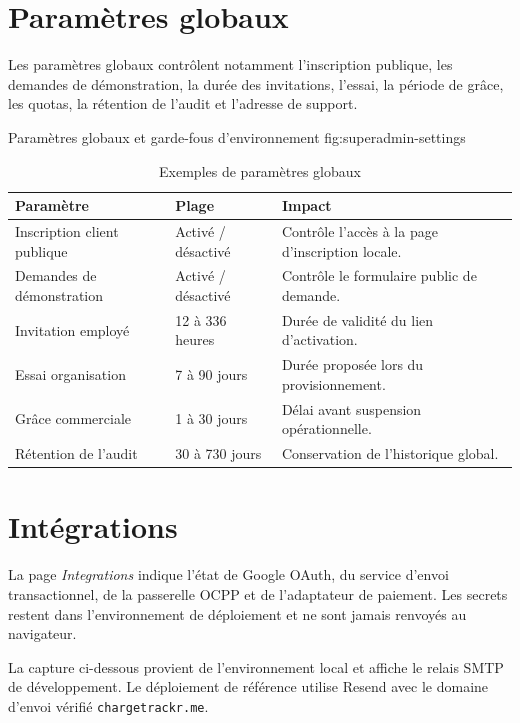 \section{Paramètres globaux}

Les paramètres globaux contrôlent notamment l'inscription publique, les
demandes de démonstration, la durée des invitations, l'essai, la période de
grâce, les quotas, la rétention de l'audit et l'adresse de support.

  {Paramètres globaux et garde-fous d'environnement}
  {fig:superadmin-settings}

\begin{table}[H]
  \centering
  \caption{Exemples de paramètres globaux}
  \label{tab:platform-settings}
  \begin{tabularx}{\textwidth}{|L{4.8cm}|L{3.2cm}|Y|}
    \hline
    \textbf{Paramètre} & \textbf{Plage} & \textbf{Impact} \\ \hline
    Inscription client publique & Activé / désactivé & Contrôle l'accès à la
    page d'inscription locale. \\ \hline
    Demandes de démonstration & Activé / désactivé & Contrôle le formulaire
    public de demande. \\ \hline
    Invitation employé & 12 à 336 heures & Durée de validité du lien
    d'activation. \\ \hline
    Essai organisation & 7 à 90 jours & Durée proposée lors du provisionnement.
    \\ \hline
    Grâce commerciale & 1 à 30 jours & Délai avant suspension opérationnelle.
    \\ \hline
    Rétention de l'audit & 30 à 730 jours & Conservation de l'historique global.
    \\ \hline
  \end{tabularx}
\end{table}

\section{Intégrations}

La page \emph{Integrations} indique l'état de Google OAuth, du service d'envoi
transactionnel, de la passerelle OCPP et de l'adaptateur de paiement. Les
secrets restent dans l'environnement de déploiement et ne sont jamais renvoyés
au navigateur.

La capture ci-dessous provient de l'environnement local et affiche le relais
SMTP de développement. Le déploiement de référence utilise Resend avec le
domaine d'envoi vérifié \texttt{chargetrackr.me}.

